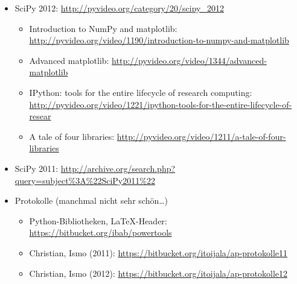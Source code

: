 \begin{itemize}
\begin{itemize}
    \end{itemize}
  \item SciPy 2012: \url{http://pyvideo.org/category/20/scipy\_2012}
    \begin{itemize}
      \item Introduction to NumPy and matplotlib: \url{http://pyvideo.org/video/1190/introduction-to-numpy-and-matplotlib}
      \item Advanced matplotlib: \url{http://pyvideo.org/video/1344/advanced-matplotlib}
      \item IPython: tools for the entire lifecycle of research computing: \url{http://pyvideo.org/video/1221/ipython-tools-for-the-entire-lifecycle-of-resear}
      \item A tale of four libraries: \url{http://pyvideo.org/video/1211/a-tale-of-four-libraries}
    \end{itemize}
  \item SciPy 2011: \url{http://archive.org/search.php?query=subject\%3A\%22SciPy2011\%22}
  \item Protokolle (manchmal nicht sehr schön…)
    \begin{itemize}
      \item Python-Bibliotheken, \LaTeX-Header: \url{https://bitbucket.org/ibab/powertools}
      \item Christian, Ismo (2011): \url{https://bitbucket.org/itoijala/ap-protokolle11}
      \item Christian, Ismo (2012): \url{https://bitbucket.org/itoijala/ap-protokolle12}
    \end{itemize}
\end{itemize}

